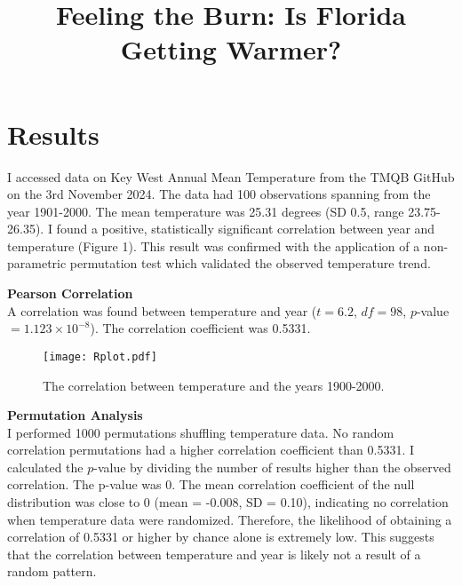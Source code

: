 \documentclass[12pt]{article} %
\title{Feeling the Burn: Is Florida Getting Warmer?}
\begin{document}
\maketitle

\section*{Results} 

I accessed data on Key West Annual Mean Temperature from the TMQB GitHub on the 3rd November 2024. The data had 100 observations spanning from the year 1901-2000. The mean temperature was 25.31 degrees (SD 0.5, range 23.75-26.35). I found a positive, statistically significant correlation between year and temperature (Figure 1). This result was confirmed with the application of a non-parametric permutation test which validated the observed temperature trend.  

\textbf{Pearson Correlation}\\
A correlation was found between temperature and year ($t = 6.2$, $df = 98$, $p$-value $= 1.123 \times 10^{-8}$). The correlation coefficient was 0.5331. 

\begin{figure}[h]
    \centering
    \texttt{[image: Rplot.pdf]}
    \caption{The correlation between temperature and the years 1900-2000. }
    \label{fig:sample_image}
\end{figure}

\textbf{Permutation Analysis}\\
I performed 1000 permutations shuffling temperature data. No random correlation permutations had a higher correlation coefficient than 0.5331. I calculated the $p$-value by dividing the number of results higher than the observed correlation. The p-value was 0. The mean correlation coefficient of the null distribution was close to 0 (mean = -0.008, SD = 0.10), indicating no correlation when temperature data were randomized. Therefore, the likelihood of obtaining a correlation of 0.5331 or higher by chance alone is extremely low. This suggests that the correlation between temperature and year is likely not a result of a random pattern.
\end{document}

